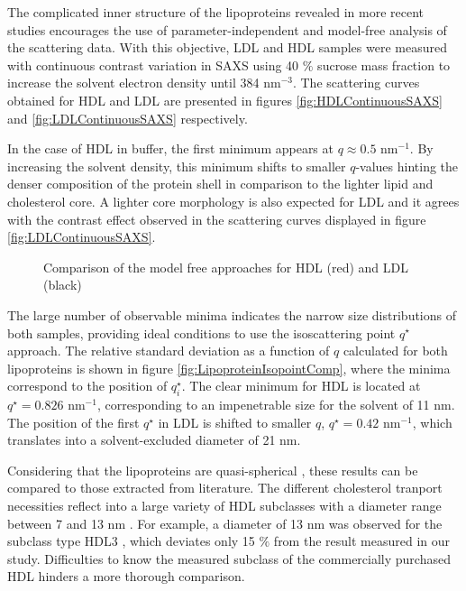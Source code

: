 The complicated inner structure of the lipoproteins revealed in more recent studies \citep{baumstark_structure_1990,schnitzer_re-evaluation_1994} encourages the use of parameter-independent and model-free analysis of the scattering data. With this objective, LDL and HDL samples were measured with continuous contrast variation in SAXS using 40 $\%$ sucrose mass fraction to increase the solvent electron density until 384 nm$^{-3}$. The scattering curves obtained for HDL and LDL are presented in figures \ref{fig:HDLContinuousSAXS} and \ref{fig:LDLContinuousSAXS} respectively.

In the case of HDL in buffer, the first minimum appears at $q\approx0.5$ nm$^{-1}$. By increasing the solvent density, this minimum shifts to smaller $q$-values hinting the denser composition of the protein shell in comparison to the lighter lipid and cholesterol core. A lighter core morphology is also expected for LDL \citep{luzzati_structure_1979} and it agrees with the contrast effect observed in the scattering curves displayed in figure \ref{fig:LDLContinuousSAXS}.

\begin{figure}
	\centering
		\qquad
		\caption[Model free-approaches to the experimental data of HDL and LDL.]{Comparison of the model free approaches for HDL (red) and LDL (black)}
\end{figure}

The large number of observable minima indicates the narrow size distributions of both samples, providing ideal conditions to use the isoscattering point $q^{\star}$ approach. The relative standard deviation as a function of $q$ calculated for both lipoproteins is shown in figure \ref{fig:LipoproteinIsopointComp}, where the minima correspond to the position of $q^{\star}_i$. The clear minimum for HDL is located at $q^{\star}=0.826$ nm$^{-1}$, corresponding to an impenetrable size for the solvent of 11 nm. The position of the first $q^{\star}$ in LDL is shifted to smaller $q$, $q^{\star}=0.42$ nm$^{-1}$, which translates into a solvent-excluded diameter of 21 nm.

Considering that the lipoproteins are quasi-spherical \citep{stuhrmann_neutron_1975}, these results can be compared to those extracted from literature. The different cholesterol tranport necessities reflect into a large variety of HDL subclasses with a diameter range between 7 and 13 nm \citep{german_lipoproteins:_2006}. For example, a diameter of 13 nm was observed for the subclass type HDL3 \citep{tardieu_structure_1976}, which deviates only 15 $\%$ from the result measured in our study. Difficulties to know the measured subclass of the commercially purchased HDL hinders a more thorough comparison.

